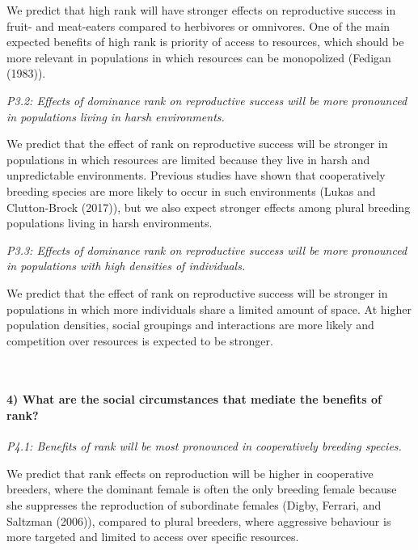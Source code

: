 \documentclass[]{article}
\let\oldparagraph\paragraph
\renewcommand{\paragraph}[1]{\oldparagraph{#1}\mbox{}}
\begin{document}
We predict that high rank will have stronger effects on reproductive
success in fruit- and meat-eaters compared to herbivores or omnivores.
One of the main expected benefits of high rank is priority of access to
resources, which should be more relevant in populations in which
resources can be monopolized (Fedigan (1983)).

\emph{P3.2: Effects of dominance rank on reproductive success will be
more pronounced in populations living in harsh environments.}

We predict that the effect of rank on reproductive success will be
stronger in populations in which resources are limited because they live
in harsh and unpredictable environments. Previous studies have shown
that cooperatively breeding species are more likely to occur in such
environments (Lukas and Clutton-Brock (2017)), but we also expect
stronger effects among plural breeding populations living in harsh
environments.

\emph{P3.3: Effects of dominance rank on reproductive success will be
more pronounced in populations with high densities of individuals.}

We predict that the effect of rank on reproductive success will be
stronger in populations in which more individuals share a limited amount
of space. At higher population densities, social groupings and
interactions are more likely and competition over resources is expected
to be stronger.

~

\hypertarget{what-are-the-social-circumstances-that-mediate-the-benefits-of-rank-1}{%
\paragraph{\texorpdfstring{\textbf{4) What are the social circumstances
that mediate the benefits of
rank?}}{4) What are the social circumstances that mediate the benefits of rank?}}\label{what-are-the-social-circumstances-that-mediate-the-benefits-of-rank-1}}

\emph{P4.1: Benefits of rank will be most pronounced in cooperatively
breeding species.}

We predict that rank effects on reproduction will be higher in
cooperative breeders, where the dominant female is often the only
breeding female because she suppresses the reproduction of subordinate
females (Digby, Ferrari, and Saltzman (2006)), compared to plural
breeders, where aggressive behaviour is more targeted and limited to
access over specific resources.
\end{document}
